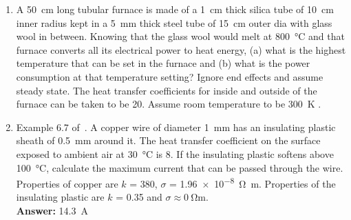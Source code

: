 \begin{enumerate}
 \item A \SI{50}{\cm} long tubular furnace is made of a \SI{1}{\cm} thick silica
tube of \SI{10}{\cm} inner radius kept in a \SI{5}{\mm} thick steel tube of
\SI{15}{\cm} outer dia with glass wool in between. Knowing that the glass wool
would melt at \SI{800}{\celsius} and that furnace converts all its electrical
power to heat energy, (a) what is the highest temperature that can be set in the
furnace and (b) what is the power consumption at that temperature setting? 
Ignore end effects and assume steady state. The heat transfer coefficients for
inside and outside of the furnace can be taken to be \SI{20}{\wpmsk}. Assume
room temperature to be \SI{300}{\kelvin} .


 \item Example 6.7 of~\cite{gaskell}. A copper wire of diameter \SI{1}{
		 \milli\metre} has an insulating plastic sheath of \SI{0.5}{\mm} around it. The
heat transfer coefficient on the surface exposed to ambient air at
\SI{30}{\celsius} is \SI{8}{\wpmsk}. If the insulating plastic softens above
\SI{100}{\celsius}, calculate the maximum current that can be passed through the
wire. Properties of copper are $k$ = \SI{380}{\wpmk}, $\sigma$ =
\SI{1.96e-8}{\ohm\metre}. Properties of the insulating plastic are $k$ =
		\SI{0.35}{\wpmk} and $\sigma \approx \SI{0}{\ohm\metre}$. \\ {\bf Answer:} \SI{14.3}{
			\ampere}
\end{enumerate}

